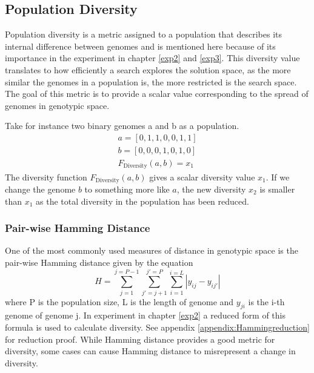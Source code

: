 \subsection{Population Diversity}
\label{background:diversity}
Population diversity is a metric assigned to a population that describes its internal difference between genomes and is mentioned here because of its importance in the experiment in chapter \ref{exp2} and \ref{exp3}. This diversity value translates to how efficiently a search explores the solution space, as the more similar the genomes in a population is, the more restricted is the search space. The goal of this metric is to provide a scalar value corresponding to the spread of genomes in genotypic space. 

Take for instance two binary genomes a and b as a population.
\begin{equation*}
    \begin{split}
        a = [0, 1, 1, 0, 0, 1, 1]\\
        b = [0, 0, 0, 1, 0, 1, 0]\\
        F_{\text{Diversity}}(a, b)=x_{1}
    \end{split}
\end{equation*}
The diversity function \(F_{\text{Diversity}}(a, b)\) gives a scalar diversity value \(x_{1}\). If we change the genome \(b\) to something more like \(a\), the new diversity \(x_{2}\) is smaller than \(x_{1}\) as the total diversity in the population has been reduced. 

\subsubsection{Pair-wise Hamming Distance}
One of the most commonly used measures of distance in genotypic space\cite{populationDiversity} is the pair-wise Hamming distance given by the equation 
\begin{equation}
    \label{eq:Hamming}
    H=\sum_{j=1}^{j=P-1}\sum_{{j}'=j+1}^{{j}'=P}\sum_{i=1}^{i=L}\left |y_{ij}-y_{i{j}'}\right |
\end{equation}
where P is the population size, L is the length of genome and \(y_{ji}\) is the i-th genome of genome j. In experiment in chapter \ref{exp2} a reduced form of this formula is used to calculate diversity. See appendix \ref{appendix:Hammingreduction} for reduction proof. While Hamming distance provides a good metric for diversity, some cases can cause Hamming distance to misrepresent a change in diversity. 

